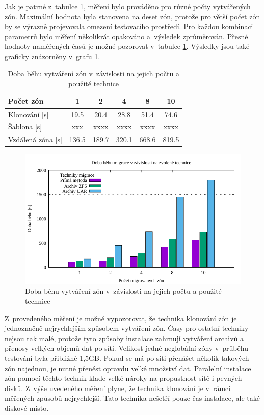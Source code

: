 Jak je patrné z~tabulce \ref{table:measuremet:creation}, měření bylo prováděno pro různé počty vytvářených zón. Maximální
hodnota byla stanovena na deset zón, protože pro větší počet zón by se výrazně projevovala omezení testovacího prostředí. Pro každou
kombinaci parametrů bylo měření několikrát opakováno a~výsledek zprůměrován. Přesné hodnoty naměřených časů je možné pozorovat v~tabulce
\ref{table:measuremet:creation}. Výsledky jsou také graficky znázorněny v~grafu \ref{graph:measuremet:creation}.
\begin{table}
  \centering
  \label{table:measuremet:creation}
  \caption{Doba běhu vytváření zón v~závislosti na jejich počtu a použité technice}
  \begin{tabular}{ l | c c c c c}
   Počet zón & 1 & 2 & 4 & 8 & 10 \\ \hline
   Klonování [s] & 19.5 & 20.4 & 28.8 & 51.4 & 74.6 \\
   Šablona [s] & xxx & xxxx & xxxx & xxxx & xxxx \\
   Vzdálená zóna [s] & 136.5 & 189.7 & 320.1 & 668.6 & 819.5 \\
  \end{tabular}
\end{table}

\begin{figure}
  \centering
  \label{graph:measuremet:creation}
  \includegraphics{assets/pdfs/measurement_migration.pdf}
  \caption{Doba běhu vytváření zón v~závislosti na jejich počtu a použité technice}
\end{figure}

Z~provedeného měření je možné vypozorovat, že technika klonování zón je jednoznačně nejrychlejším způsobem vytváření zón. Časy
pro ostatní techniky nejsou tak malé, protože tyto způsoby instalace zahrnují vytváření archivů a přenosy velkých objemů dat
po síti. Velikost jedné neglobální zóny v~průběhu testování byla přibližně 1,5GB. Pokud se má po síti přenášet několik takových
zón najednou, je nutné přenést opravdu velké množství dat. Paralelní instalace zón pomocí těchto technik klade velké nároky na
propustnost sítě i pevných disků. Z~výše uvedeného měření plyne, že technika klonování je v~rámci měřených způsobů nejrychlejší.
Tato technika nešetří pouze čas instalace, ale také diskové místo.
